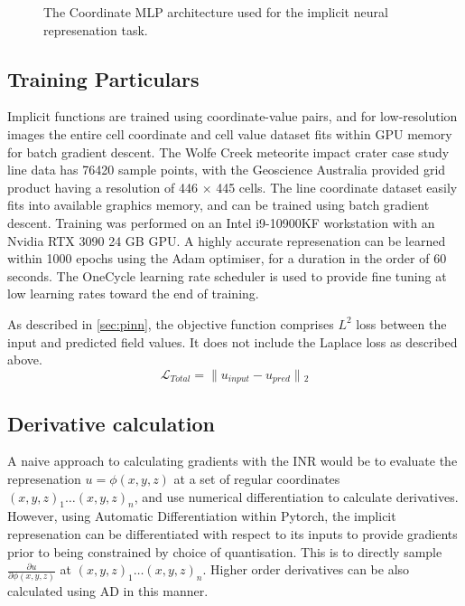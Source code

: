 \documentclass[manuscript.tex]{subfiles}
\begin{document}
\begin{figure}[hbt]
    \label{fig:arch}
    \caption[Network Architecture]{The Coordinate MLP architecture used for the implicit neural represenation task.}
\end{figure}

\subsection{Training Particulars}
\label{sec:training}

Implicit functions are trained using coordinate-value pairs, and for low-resolution images the entire cell coordinate and cell value dataset fits within GPU memory for batch gradient descent.
The Wolfe Creek meteorite impact crater case study line data has \SI{76420}{} sample points, with the Geoscience Australia provided grid product having a resolution of 446 \(\times{}\) 445 cells.
The line coordinate dataset easily fits into available graphics memory, and can be trained using batch gradient descent.
Training was performed on an Intel i9-10900KF workstation with an Nvidia RTX 3090 24 GB GPU\@.
A highly accurate represenation can be learned within 1000 epochs using the Adam optimiser, for a duration in the order of 60 seconds.
The OneCycle learning rate scheduler \parencite{smithSuperconvergenceVeryFast2018} is used to provide fine tuning at low learning rates toward the end of training.

As described in \cref{sec:pinn}, the objective function comprises \(L^2\) loss between the input and predicted field values.
It does not include the Laplace loss as described above. %
\begin{equation}
    \label{eqn:cri}
    \mathcal{L}_{Total} = \lVert{}u_{input} - u_{pred}\rVert{}_{2} %
\end{equation}

\subsection{Derivative calculation}
A naive approach to calculating gradients with the INR would be to evaluate the represenation \(u = \phi{}(x, y, z)\) at a set of regular coordinates \({(x, y, z)}_1 \dots {(x,y,z)}_n\), and use numerical differentiation to calculate derivatives.
However, using Automatic Differentiation within Pytorch, the implicit represenation can be differentiated with respect to its inputs to provide gradients prior to being constrained by choice of quantisation.
This is to directly sample \(\frac{\partial{u}}{\partial{\phi{}{(x,y,z)}}}\) at \({(x, y, z)}_1 \dots {(x,y,z)}_n\).
Higher order derivatives can be also calculated using AD in this manner.
\end{document}
